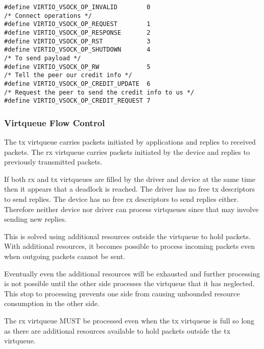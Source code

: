 \begin{lstlisting}
#define VIRTIO_VSOCK_OP_INVALID        0
/* Connect operations */
#define VIRTIO_VSOCK_OP_REQUEST        1
#define VIRTIO_VSOCK_OP_RESPONSE       2
#define VIRTIO_VSOCK_OP_RST            3
#define VIRTIO_VSOCK_OP_SHUTDOWN       4
/* To send payload */
#define VIRTIO_VSOCK_OP_RW             5
/* Tell the peer our credit info */
#define VIRTIO_VSOCK_OP_CREDIT_UPDATE  6
/* Request the peer to send the credit info to us */
#define VIRTIO_VSOCK_OP_CREDIT_REQUEST 7
\end{lstlisting}

\subsubsection{Virtqueue Flow Control}\label{sec:Device Types / Socket Device / Device Operation / Virtqueue Flow Control}

The tx virtqueue carries packets initiated by applications and replies to
received packets.  The rx virtqueue carries packets initiated by the device and
replies to previously transmitted packets.

If both rx and tx virtqueues are filled by the driver and device at the same
time then it appears that a deadlock is reached.  The driver has no free tx
descriptors to send replies.  The device has no free rx descriptors to send
replies either.  Therefore neither device nor driver can process virtqueues
since that may involve sending new replies.

This is solved using additional resources outside the virtqueue to hold
packets.  With additional resources, it becomes possible to process incoming
packets even when outgoing packets cannot be sent.

Eventually even the additional resources will be exhausted and further
processing is not possible until the other side processes the virtqueue that
it has neglected.  This stop to processing prevents one side from causing
unbounded resource consumption in the other side.


The rx virtqueue MUST be processed even when the tx virtqueue is full so long as there are additional resources available to hold packets outside the tx virtqueue.

